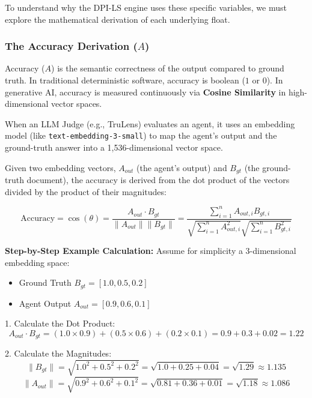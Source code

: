 \documentclass[11pt,a4paper]{article}
\begin{document}
To understand why the DPI-LS engine uses these specific variables, we must explore the mathematical derivation of each underlying float.

\vspace{0.5cm}
\subsubsection{The Accuracy Derivation ($A$)}

Accuracy ($A$) is the semantic correctness of the output compared to ground truth. In traditional deterministic software, accuracy is boolean ($1$ or $0$). In generative AI, accuracy is measured continuously via \textbf{Cosine Similarity} in high-dimensional vector spaces. 

When an LLM Judge (e.g., TruLens) evaluates an agent, it uses an embedding model (like \texttt{text-embedding-3-small}) to map the agent's output and the ground-truth answer into a 1,536-dimensional vector space.

Given two embedding vectors, $A_{out}$ (the agent's output) and $B_{gt}$ (the ground-truth document), the accuracy is derived from the dot product of the vectors divided by the product of their magnitudes:

\begin{tcolorbox}[colback=white, colframe=dpiblue, title=\textbf{Cosine Similarity Equation}]
\[ \text{Accuracy} = \cos(\theta) = \frac{A_{out} \cdot B_{gt}}{\|A_{out}\| \|B_{gt}\|} = \frac{\sum_{i=1}^{n} A_{out,i} B_{gt,i}}{\sqrt{\sum_{i=1}^{n} A_{out,i}^2} \sqrt{\sum_{i=1}^{n} B_{gt,i}^2}} \]
\end{tcolorbox}

\textbf{Step-by-Step Example Calculation:}
Assume for simplicity a 3-dimensional embedding space:
\begin{itemize}
    \item Ground Truth $B_{gt} = [1.0, 0.5, 0.2]$
    \item Agent Output $A_{out} = [0.9, 0.6, 0.1]$
\end{itemize}

1. Calculate the Dot Product:
\[ A_{out} \cdot B_{gt} = (1.0 \times 0.9) + (0.5 \times 0.6) + (0.2 \times 0.1) = 0.9 + 0.3 + 0.02 = 1.22 \]

2. Calculate the Magnitudes:
\[ \|B_{gt}\| = \sqrt{1.0^2 + 0.5^2 + 0.2^2} = \sqrt{1.0 + 0.25 + 0.04} = \sqrt{1.29} \approx 1.135 \]
\[ \|A_{out}\| = \sqrt{0.9^2 + 0.6^2 + 0.1^2} = \sqrt{0.81 + 0.36 + 0.01} = \sqrt{1.18} \approx 1.086 \]
\end{document}
